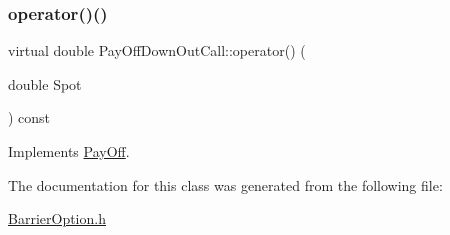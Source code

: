 \subsubsection{\texorpdfstring{operator()()}{operator()()}}
{\footnotesize\ttfamily virtual double Pay\+Off\+Down\+Out\+Call\+::operator() (\begin{DoxyParamCaption}\item[{double}]{Spot }\end{DoxyParamCaption}) const\hspace{0.3cm}{\ttfamily [virtual]}}



Implements \hyperlink{classPayOff_a5ae17d82c233ef5568c8fb0539703000}{Pay\+Off}.



The documentation for this class was generated from the following file\+:\begin{DoxyCompactItemize}
\item 
\hyperlink{BarrierOption_8h}{Barrier\+Option.\+h}\end{DoxyCompactItemize}
